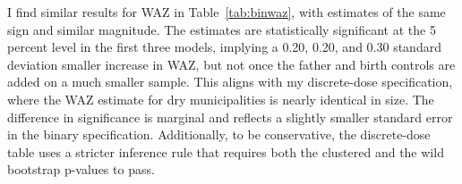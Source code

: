 \documentclass[12pt]{article}
\begin{document}
I find similar results for WAZ in Table~\ref{tab:binwaz}, with estimates of the same sign and similar magnitude. The estimates are statistically significant at the 5 percent level in the first three models, implying a 0.20, 0.20, and 0.30 standard deviation smaller increase in WAZ, but not once the father and birth controls are added on a much smaller sample. This aligns with my discrete-dose specification, where the WAZ estimate for dry municipalities is nearly identical in size. The difference in significance is marginal and reflects a slightly smaller standard error in the binary specification. Additionally, to be conservative, the discrete-dose table uses a stricter inference rule that requires both the clustered and the wild bootstrap p-values to pass.

\begingroup{}
\begingroup
\footnotesize
\renewcommand{\arraystretch}{0.86}
\setlength{\tabcolsep}{4pt}
\setlength{\LTcapwidth}{\textwidth}
\end{document}
